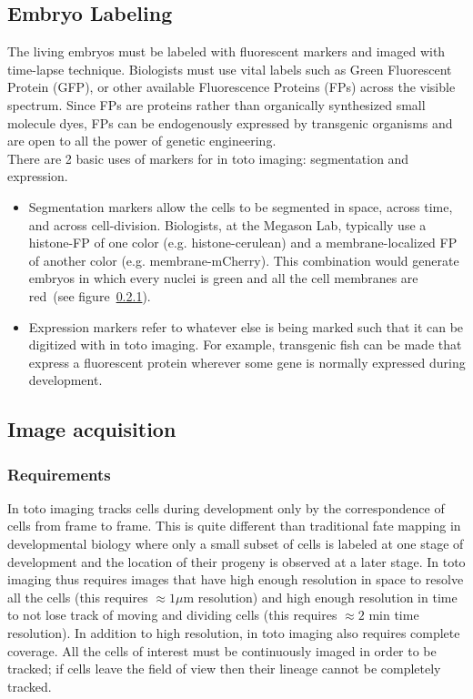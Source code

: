 \subsection{Embryo Labeling}

The living embryos must be labeled with fluorescent markers and imaged with
time-lapse technique. Biologists must use vital labels such as Green
Fluorescent Protein (GFP), or other available Fluorescence Proteins (FPs) across
the visible spectrum. Since FPs are proteins rather than organically synthesized
small molecule dyes, FPs can be endogenously expressed by transgenic organisms
and are open to all the power of genetic engineering.\\

There are 2 basic uses of markers for in toto imaging: segmentation and
expression.
\begin{itemize}
 \item Segmentation markers allow the cells to be segmented in space,
across time, and across cell-division. Biologists, at the Megason Lab, typically
use a histone-FP of one color (e.g. histone-cerulean) and a membrane-localized
FP of another color (e.g. membrane-mCherry). This combination would generate
embryos in which every nuclei is green and all the cell membranes are red~(see
figure~\ref{}).
 \item Expression markers refer to whatever else is being marked such that it
can be digitized with in toto imaging. For example, transgenic fish can be made
that express a fluorescent protein wherever some gene is normally expressed
during development.
\end{itemize}


\subsection{Image acquisition}

\subsubsection{Requirements}

In toto imaging tracks cells during development only by the correspondence of
cells from frame to frame. This is quite different than traditional fate mapping
in developmental biology where only a small subset of cells is labeled at one
stage of development and the location of their progeny is observed at a
later stage. In toto imaging thus requires images that have high enough
resolution in space to resolve all the cells (this requires $\approx
1 \mu$m resolution) and high enough resolution in time to not lose track of
moving and dividing cells (this requires $\approx 2$ min time resolution). In
addition to high resolution, in toto imaging also requires complete coverage.
All the cells of interest must be continuously imaged in order to be tracked; if
cells leave the field of view then their lineage cannot be completely tracked.


